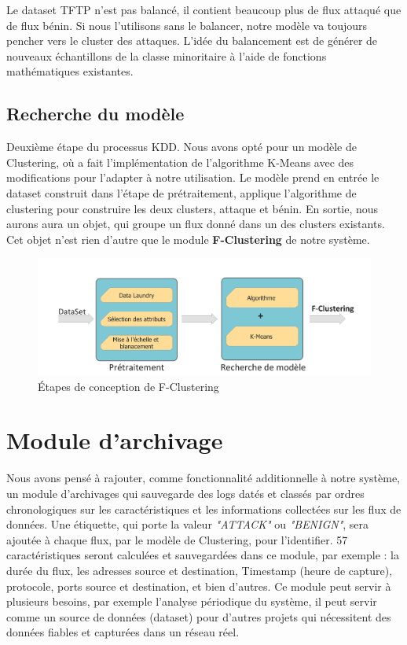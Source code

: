 \begin{table}[h]
\begin{center}
Le dataset TFTP n'est pas balancé, il contient beaucoup plus de flux attaqué que de flux bénin. Si nous l'utilisons sans le balancer, notre modèle va toujours pencher vers le cluster des attaques. L'idée du balancement est de générer de nouveaux échantillons de la classe minoritaire à l'aide de fonctions mathématiques existantes.

\subsection{Recherche du modèle}
Deuxième étape du processus KDD. Nous avons opté pour un modèle de Clustering, où a fait l'implémentation de l'algorithme K-Means avec des modifications pour l'adapter à notre utilisation. Le modèle prend en entrée le dataset construit dans l'étape de prétraitement, applique l'algorithme de clustering pour construire les deux clusters, attaque et bénin. En sortie, nous aurons aura un objet, qui groupe un flux donné dans un des clusters existants. Cet objet n'est rien d'autre que le module \textbf{F-Clustering} de notre système.
\begin{figure}[h]
\centering
\includegraphics[width=\textwidth]{Figures/Diagramme2}
\decoRule
\caption{Étapes de conception de F-Clustering}
\label{fig:F-Clustering_Diagramme}
\end{figure} 

\section{Module d'archivage}
Nous avons pensé à rajouter, comme fonctionnalité additionnelle à notre système, un module d’archivages qui sauvegarde des logs datés et classés par ordres chronologiques sur les caractéristiques et les informations collectées sur les flux de données.  Une étiquette, qui porte la valeur \textit{"ATTACK"} ou \textit{"BENIGN"}, sera ajoutée à chaque flux, par le modèle de Clustering, pour l'identifier. 57 caractéristiques seront calculées et sauvegardées dans ce module, par exemple : la durée du flux, les adresses source et destination, Timestamp (heure de capture), protocole, ports source et destination, et bien d'autres. Ce module peut servir à plusieurs besoins, par exemple l'analyse périodique du système, il peut servir comme un source de données (dataset) pour d'autres projets qui nécessitent des données fiables et capturées dans un réseau réel. 


\end{center}
\end{table}
